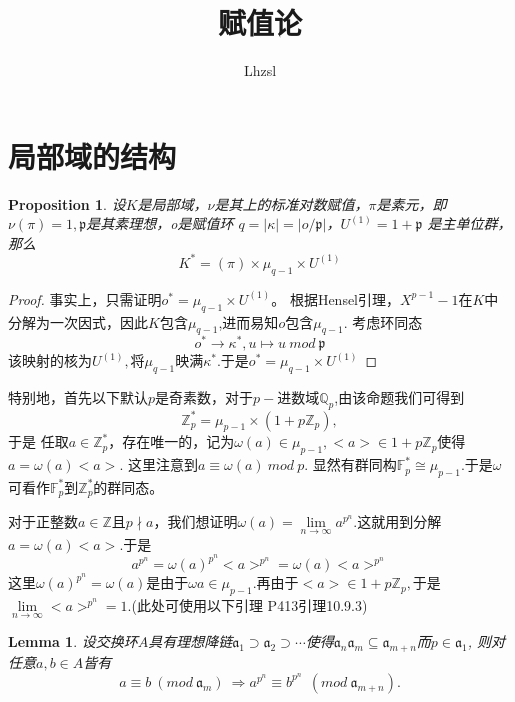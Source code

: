 \documentclass[UTF8]{article}
\title{\textbf{\huge{赋值论}}}
\author{Lhzsl}
\date{}
\newtheorem{prop}{Proposition}[section]
\newtheorem{lem}{Lemma}[section]
\begin{document}
	\maketitle
	\section{局部域的结构}
	\begin{prop}
		设$K$是局部域，$\nu$是其上的标准对数赋值，$\pi$是素元，即$\nu(\pi)=1,\mathfrak{p}$是其素理想，o是赋值环 $q=|\kappa|=|o/\mathfrak{p}|$，$U^{(1)}=1+\mathfrak{p}$
  是主单位群，那么
  $$
  K^{*}=(\pi)\times \mu_{q-1}\times U^{(1)}
  $$	
\end{prop}
\begin{proof}
事实上，只需证明$o^{*}=\mu_{q-1}\times U^{(1)}$。
根据Hensel引理，$X^{p-1}-1$在$K$中分解为一次因式，因此$K$包含$\mu_{q-1}$,进而易知$o$包含$\mu_{q-1}$.
考虑环同态  
$$o^{*}\rightarrow \kappa^{*} ,u\mapsto u \ mod \ \mathfrak{p}$$
该映射的核为$U^{(1)},$将$\mu_{q-1}$映满$\kappa^{*}$.于是$
o^{*}=\mu_{q-1}\times U^{(1)}$

\end{proof}
特别地，首先以下默认$p$是奇素数，对于$p-$进数域$\mathbb{Q}_{p}$,由该命题我们可得到
$$\mathbb{Z}_{p}^{*}=\mu_{p-1}\times (1+p\mathbb{Z}_{p}),$$于是
任取$a\in \mathbb{Z}_{p}^{*}$，存在唯一的，记为$\omega(a)\in \mu_{p-1},<a>\in 1+p\mathbb{Z}_{p}$使得$a=\omega(a)<a>.$
这里注意到$a\equiv \omega(a)\ mod \ p.$
	显然有群同构$\mathbb{F}_{p}^{*}\cong \mu_{p-1}$.于是$\omega$可看作$\mathbb{F}_{p}^{*}$到$\mathbb{Z}_{p}^{*}$的群同态。
	
	
	对于正整数$a\in\mathbb{Z}$且$p\nmid a$，我们想证明$\omega(a)=\lim\limits_{n\rightarrow \infty }a^{p^{n}}$.这就用到分解$a=\omega(a)<a>.$于是
	$$
	a^{p^{n}}=\omega(a)^{p^{n}}<a>^{p^{n}}=\omega(a)<a>^{p^{n}}
	$$
	这里$\omega(a)^{p^{n}}=\omega(a)$是由于$\omega{a}\in \mu_{p-1}$.再由于$<a>\in 1+p\mathbb{Z}_{p},$于是$\lim\limits_{n\rightarrow \infty}<a>^{p^{n}}=1.$(此处可使用以下引理\cite{wwl} P413引理10.9.3)
	\begin{lem}
		设交换环$A$具有理想降链$\mathfrak{a}_{1}\supset\mathfrak{a}_{2}\supset \cdots$使得$\mathfrak{a}_{n}\mathfrak{a}_{m}\subseteq \mathfrak{a}_{m+n}$而$p\in \mathfrak{a}_{1}$,
		则对任意$a,b\in A$皆有
		$$
		a\equiv b\ (mod\ \mathfrak{a}_{m})\ \Longrightarrow 
		a^{p^{n}}\equiv b^{p^{n}}\ \ (mod \ \mathfrak{a}_{m+n}).
		$$
	\end{lem}
\end{document}
